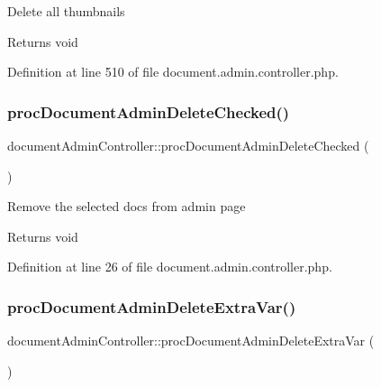 Delete all thumbnails \begin{DoxyReturn}{Returns}
void 
\end{DoxyReturn}


Definition at line 510 of file document.\+admin.\+controller.\+php.

\hypertarget{classdocumentAdminController_a98c455685a7e8e4ab6633a8a66e6f712}{}\label{classdocumentAdminController_a98c455685a7e8e4ab6633a8a66e6f712} 
\subsubsection{\texorpdfstring{proc\+Document\+Admin\+Delete\+Checked()}{procDocumentAdminDeleteChecked()}}
{\footnotesize\ttfamily document\+Admin\+Controller\+::proc\+Document\+Admin\+Delete\+Checked (\begin{DoxyParamCaption}{ }\end{DoxyParamCaption})}

Remove the selected docs from admin page \begin{DoxyReturn}{Returns}
void 
\end{DoxyReturn}


Definition at line 26 of file document.\+admin.\+controller.\+php.

\hypertarget{classdocumentAdminController_a44eca9af136c50f1d6624a4de83b596a}{}\label{classdocumentAdminController_a44eca9af136c50f1d6624a4de83b596a} 
\subsubsection{\texorpdfstring{proc\+Document\+Admin\+Delete\+Extra\+Var()}{procDocumentAdminDeleteExtraVar()}}
{\footnotesize\ttfamily document\+Admin\+Controller\+::proc\+Document\+Admin\+Delete\+Extra\+Var (\begin{DoxyParamCaption}{ }\end{DoxyParamCaption})}

